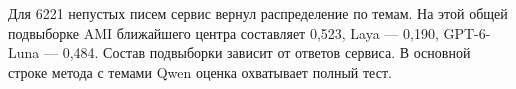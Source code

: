 Для 6221 непустых писем сервис вернул распределение по темам. На этой общей подвыборке AMI ближайшего центра составляет 0,523, Laya --- 0,190, GPT-6-Luna --- 0,484. Состав подвыборки зависит от ответов сервиса. В основной строке метода с темами Qwen оценка охватывает полный тест.
